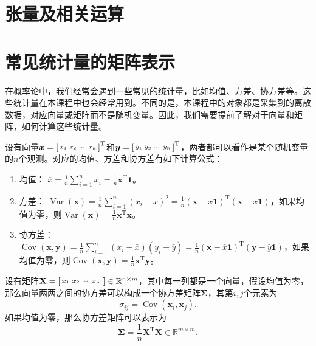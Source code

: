 \section{张量及相关运算}

\section{常见统计量的矩阵表示}

在概率论中，我们经常会遇到一些常见的统计量，比如均值、方差、协方差等。这些统计量在本课程中也会经常用到。不同的是，本课程中的对象都是采集到的离散数据，对应向量或矩阵而不是随机变量。因此，我们需要提前了解对于向量和矩阵，如何计算这些统计量。

设有向量\( \boldsymbol{x} = \begin{bsmallmatrix} x_1 & x_2 & \cdots & x_n \end{bsmallmatrix}^{\mathrm{T}} \)和\( \boldsymbol{y} =  \begin{bsmallmatrix} y_1 & y_2 & \cdots & y_n \end{bsmallmatrix}^{\mathrm{T}} \)，两者都可以看作是某个随机变量的\( n \)个观测。对应的均值、方差和协方差有如下计算公式：
\begin{enumerate}
    \item 均值： \( \overline{x} = \frac{1}{n} \sum_{i=1}^n x_i = \frac{1}{n} \bm{x}^{\mathrm{T}} \mathbf{1} \)。
    \item 方差： \( \operatorname{Var}(\bm{x}) = \frac{1}{n} \sum_{i=1}^n (x_i - \bar{x})^2 = \frac{1}{n} (\bm{x} - \bar{x}\mathbf{1} )^{\mathrm{T}} (\bm{x} - \bar{x} \mathbf{1}) \)，如果均值为零，则\( \operatorname{Var}(\bm{x}) =  \frac{1}{n} \bm{x}^{\mathrm{T}} \bm{x} \)。
    \item 协方差： \( \operatorname{Cov}(\bm{x}, \bm{y}) = \frac{1}{n} \sum_{i=1}^n (x_i - \bar{x})(y_i - \bar{y}) = \frac{1}{n} (\bm{x} - \bar{x}\mathbf{1} )^{\mathrm{T}} (\bm{y} - \bar{y} \mathbf{1}) \)，如果均值为零，则\( \operatorname{Cov}(\bm{x}, \bm{y}) =  \frac{1}{n} \bm{x}^{\mathrm{T}} \bm{y} \)。
\end{enumerate}

设有矩阵\( \mathbf{X} = \begin{bsmallmatrix} \boldsymbol{x}_1 & \boldsymbol{x}_2 & \cdots & \boldsymbol{x}_m \end{bsmallmatrix} \in \mathbb{R}^{n \times m} \)，其中每一列都是一个向量，假设均值为零，那么向量两两之间的协方差可以构成一个协方差矩阵\( \mathbf{\Sigma} \)，其第\( i,j \)个元素为
\[
    \sigma_{ij} = \operatorname{Cov}(\bm{x}_i, \bm{x}_j).
\]
如果均值为零，那么协方差矩阵可以表示为
\[
    \mathbf{\Sigma} = \frac{1}{n} \mathbf{X}^{\mathrm{T}} \mathbf{X} \in \mathbb{R}^{m \times m}.
\]

